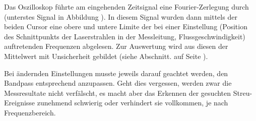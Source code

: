 Das  Oszilloskop f\"uhrte  am  eingehenden  Zeitsignal eine  Fourier-Zerlegung
durch (unterstes Signal in Abbildung
).  In  diesem  Signal  wurden  dann mittels  der  beiden  Cursor  eine  obere
und  untere  Limite der  bei  einer  Einstellung (Position  des  Schnittpunkts
der  Laserstrahlen  in  der  Messleitung,  Flussgeschwindigkeit)  auftretenden
Frequenzen  abgelesen. Zur  Auswertung  wird  aus diesen  der  Mittelwert  mit
Unsicherheit gebildet (siehe Abschnitt.
auf Seite
).

Bei  \"andernden  Einstellungen musste  jeweils  darauf  geachtet werden,  den
Bandpass  entsprechend  anzupassen. Geht  dies   vergessen,  werden  zwar  die
Messresultate nicht  verf\"alscht, es  macht aber  das Erkennen  der gesuchten
Streu-Ereignisse zunehmend  schwierig oder verhindert sie  vollkommen, je nach
Frequenzbereich.



